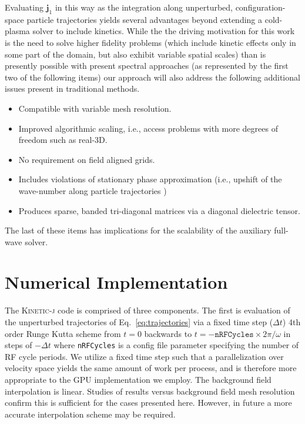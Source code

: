 \documentclass[final,5p,times,twocolumn]{elsarticle}
\renewcommand{\vec}[1]{\mathbf{#1}}
\newcommand{\kj}{\textsc{Kinetic-j}\xspace}
\newcommand{\jp}{\ensuremath{\vec{j}_{\mathrm{1}}}\xspace}
\begin{document}
Evaluating $\jp$ in this way as the integration along unperturbed, configuration-space particle trajectories yields several advantages beyond extending a cold-plasma solver to include kinetics. While the the driving motivation for this work is the need to solve higher fidelity problems (which include kinetic effects only in some part of the domain, but also exhibit variable spatial scales) than is presently possible with present spectral approaches (as represented by the first two of the following items) our approach will also address the following additional issues present in traditional methods. 
%
\begin{itemize}
\item{Compatible with variable mesh resolution.}
\item{Improved algorithmic scaling, i.e., access problems with more degrees of freedom such as real-3D.}
\item{No requirement on field aligned grids.}
\item{Includes violations of stationary phase approximation (i.e., upshift of the wave-number along particle trajectories \cite[]{berry2016})}
\item{Produces sparse, banded tri-diagonal matrices via a diagonal dielectric tensor.}
\end{itemize}
%
The last of these items has implications for the scalability of the auxiliary full-wave solver.
%
\section{Numerical Implementation}
\label{section:implementation}
%
The \kj code is comprised of three components. The first is evaluation of the unperturbed trajectories of Eq.~\ref{eq:trajectories} via a fixed time step ($\Delta t$) 4th order Runge Kutta scheme from $t=0$ backwards to $t=-\texttt{nRFCycles}\times{2\pi}/\omega$ in steps of $-\Delta t$ where \texttt{nRFCycles} is a config file parameter specifying the number of RF cycle periods. We utilize a fixed time step such that a parallelization over velocity space yields the same amount of work per process, and is therefore more appropriate to the GPU implementation we employ. The background field interpolation is linear. Studies of results versus background field mesh resolution confirm this is sufficient for the cases presented here. However, in future a more accurate interpolation scheme may be required.
\end{document}
